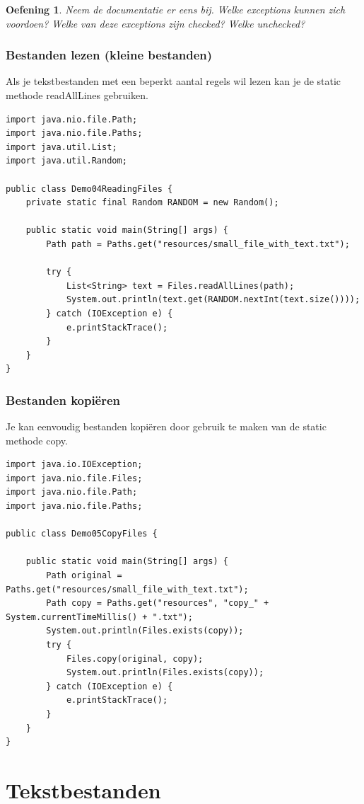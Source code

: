\documentclass{tstextbook}
\newtheorem{envoefening}{Oefening}[chapter]
\newenvironment{oefening}
               {\begin{boxexercise}\begin{envoefening}}
               {\end{envoefening}\end{boxexercise}}
\begin{document}
\begin{oefening}
Neem de documentatie er eens bij. Welke exceptions kunnen zich voordoen? Welke van deze exceptions zijn checked? Welke unchecked?
\end{oefening}


\subsubsection{Bestanden lezen (kleine bestanden)}

Als je tekstbestanden met een beperkt aantal regels wil lezen kan je de static methode readAllLines gebruiken.

\begin{lstlisting}
import java.nio.file.Path;
import java.nio.file.Paths;
import java.util.List;
import java.util.Random;

public class Demo04ReadingFiles {
	private static final Random RANDOM = new Random();

	public static void main(String[] args) {
		Path path = Paths.get("resources/small_file_with_text.txt");

		try {
			List<String> text = Files.readAllLines(path);
			System.out.println(text.get(RANDOM.nextInt(text.size())));
		} catch (IOException e) {
			e.printStackTrace();
		}
	}
}
\end{lstlisting}

\subsubsection{Bestanden kopi\"eren}

Je kan eenvoudig bestanden kopi\"eren door gebruik te maken van de static methode copy.

\begin{lstlisting}
import java.io.IOException;
import java.nio.file.Files;
import java.nio.file.Path;
import java.nio.file.Paths;

public class Demo05CopyFiles {

	public static void main(String[] args) {
		Path original = Paths.get("resources/small_file_with_text.txt");
		Path copy = Paths.get("resources", "copy_" + System.currentTimeMillis() + ".txt");
		System.out.println(Files.exists(copy));
		try {
			Files.copy(original, copy);
			System.out.println(Files.exists(copy));
		} catch (IOException e) {
			e.printStackTrace();
		}
	}
}
\end{lstlisting}

\section{Tekstbestanden}
\end{document}
